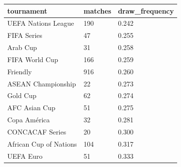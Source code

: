 \begin{tabular}{lll}
\toprule
tournament & matches & draw\_frequency \\
\midrule
UEFA Nations League & 190 & 0.242 \\
FIFA Series & 47 & 0.255 \\
Arab Cup & 31 & 0.258 \\
FIFA World Cup & 166 & 0.259 \\
Friendly & 916 & 0.260 \\
ASEAN Championship & 22 & 0.273 \\
Gold Cup & 62 & 0.274 \\
AFC Asian Cup & 51 & 0.275 \\
Copa América & 32 & 0.281 \\
CONCACAF Series & 20 & 0.300 \\
African Cup of Nations & 104 & 0.317 \\
UEFA Euro & 51 & 0.333 \\
\bottomrule
\end{tabular}
